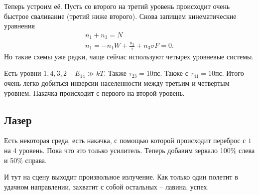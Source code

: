 Теперь устроим её. Пусть со второго на третий уровень происходит очень быстрое сваливание (третий ниже второго). 
Снова запищем кинематические уравнения
\begin{gather*}
    n_1 + n_3 = N \\
    \dot{n}_1 = - n_1 W + \frac{n_3}{\tau} + n_3 \sigma F = 0.
\end{gather*}
Но такие схемы уже редки, чаще сейчас используют четырех уровневые системы.

Есть уровни $1,4,3,2$ -- $E_{14} \gg k T$. Также $\tau_{23} = 10$пс. Также с $\tau_{41} = 10$пс. Итого очень легко добиться инверсии населенности между третьим и четвертым уровнем. Накачка происходит с первого на второй уровень. 


\subsection*{Лазер}

Есть некоторая среда, есть накачка, с помощью которой происходит переброс с $1$ на $4$ уровень. Пока что это только усилитель. Теперь добавим зеркало 100\% слева и 50\% справа. 

И тут на сцену выходит произвольное излучение. Как только один полетит в удачном направлении, захватит с собой остальных -- лавина, успех. 


